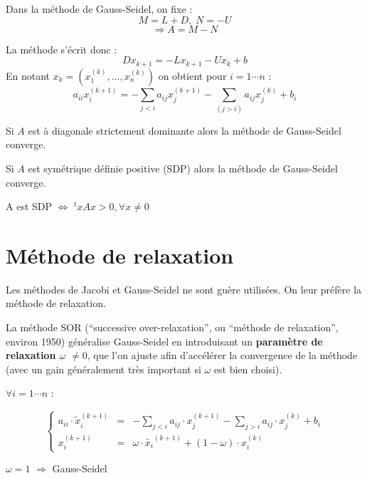 Dans la méthode de Gauss-Seidel, on fixe :
\[
    M = L + D, \; N = -U
\]
\[
    \Rightarrow A = M - N
\]

La méthode s'écrit donc :
\[
    Dx_{k+1} = -Lx_{k+1}-Ux_k + b
\]
En notant $x_k = (x^{(k)}_1,\dots,x^{(k)}_n)$ on obtient pour $i = 1 \cdots n$ :
\[
    a_{ii}x^{(k+1)}_i = - \sum_{j<i}a_{ij}x_j^{(k+1)} - \sum_{(j>i)}a_{ij}x_j^{(k)} + b_i
\]

\begin{ftheo}
    Si $A$ est à diagonale strictement dominante alors la méthode de Gauss-Seidel converge.
\end{ftheo}

\begin{ftheo}
    Si $A$ est symétrique définie positive (SDP) alors la méthode de Gauss-Seidel converge.
\end{ftheo}

A est SDP $\Leftrightarrow$ $^txAx > 0, \forall x \ne 0$


\newpage

\section{Méthode de relaxation}

Les méthodes de Jacobi et Gauss-Seidel ne sont guère utilisées. On leur préfère la méthode de relaxation.

La méthode SOR (``successive over-relaxation'', ou ``méthode de relaxation'', environ 1950) généralise Gauss-Seidel en introduisant un \textbf{paramètre de relaxation $\omega$} $\ne 0$,
que l'on ajuste afin d'accélérer la convergence de la méthode (avec un gain généralement très important si $\omega$ est bien choisi).

\begin{center}
$\forall i = 1 \cdots n$ :
\end{center}
\begin{equation}
\left\lbrace
\begin{array}{ccc}
    a_{ii} \cdot \tilde{x}_i^{(k+1)} & = & -\sum_{j<i} a_{ij} \cdot x_j^{(k+1)} - \sum_{j>i}a_{ij} \cdot x_j^{(k)} + b_i\\
    x_i^{(k+1)} & = & \omega \cdot \tilde{x_i}^{(k+1)} + (1-\omega) \cdot x_i^{(k)}
    \label{eq:4}
\end{array}\right.
\end{equation}

\begin{center}
\underline {$\omega = 1$} $\Rightarrow$ Gauss-Seidel
\end{center}


